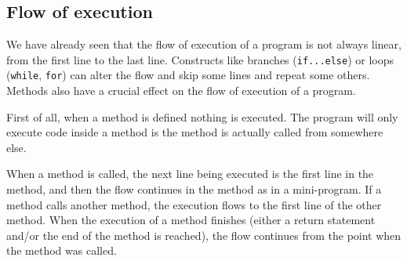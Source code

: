 \subsection{Flow of execution}
\label{sec:flow-execution}

We have already seen that the flow of execution of a program is not
always linear, from the first line to the last line. Constructs like
branches (\verb+if...else+) or loops (\verb+while+, \verb+for+) can
alter the flow and skip some lines and repeat some others. Methods
also have a crucial effect on the flow of execution of a program. 

First of all, when a method is defined nothing is executed. The
program will only execute code inside a method is the method is
actually called from somewhere else. 

When a method is called, the next line being executed is the first
line in the method, and then the flow continues in the method as in a
mini-program. If a method calls another method, the execution flows to
the first line of the other method. When the execution of a method
finishes (either a return statement and/or the end of the method is
reached), the flow continues from the point when the method was
called. 



